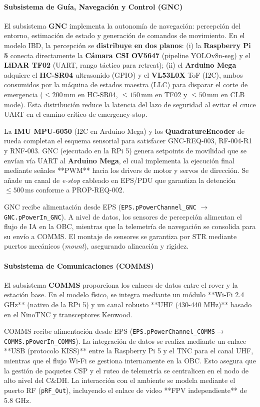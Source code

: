 \paragraph{Subsistema de Guía, Navegación y Control (GNC)}
El subsistema \textbf{GNC} implementa la autonomía de navegación: percepción del entorno, estimación de estado y generación de comandos de movimiento. En el modelo IBD, la percepción se \textbf{distribuye en dos planos}: (i) la \textbf{Raspberry Pi 5} conecta directamente la \textbf{Cámara CSI OV5647} (pipeline YOLOv8n-seg) y el \textbf{LiDAR TF02} (UART, rango táctico para retreat); (ii) el \textbf{Arduino Mega} adquiere el \textbf{HC-SR04} ultrasonido (GPIO) y el \textbf{VL53L0X} ToF (I2C), ambos consumidos por la máquina de estados maestra (LLC) para disparar el corte de emergencia ($\le 200$\,mm en HC-SR04, $\le 150$\,mm en TF02 y $\le 50$\,mm en CLB mode). Esta distribución reduce la latencia del lazo de seguridad al evitar el cruce UART en el camino crítico de emergency-stop.

La \textbf{IMU MPU-6050} (I2C en Arduino Mega) y los \textbf{QuadratureEncoder} de rueda completan el esquema sensorial para satisfacer GNC-REQ-003, RF-004-R1 y RNF-003. GNC (ejecutado en la RPi 5) genera setpoints de movilidad que se envían vía UART al \textbf{Arduino Mega}, el cual implementa la ejecución final mediante señales **PWM** hacia los drivers de motor y servos de dirección. Se añade un canal de \emph{e-stop} cableado en EPS/PDU que garantiza la detención $\le 500$\,ms conforme a PROP-REQ-002.

GNC recibe alimentación desde EPS (\texttt{EPS.pPowerChannel\_GNC} $\rightarrow$ \texttt{GNC.pPowerIn\_GNC}). A nivel de datos, los sensores de percepción alimentan el flujo de IA en la OBC, mientras que la telemetría de navegación se consolida para su envío a COMMS. El montaje de sensores se garantiza por STR mediante puertos mecánicos (\textit{mount}), asegurando alineación y rigidez.

\paragraph{Subsistema de Comunicaciones (COMMS)}
El subsistema \textbf{COMMS} proporciona los enlaces de datos entre el rover y la estación base. En el modelo físico, se integra mediante un módulo **Wi-Fi 2.4 GHz** (nativo de la RPi 5) y un canal robusto **UHF (430-440 MHz)** basado en el NinoTNC y transceptores Kenwood. 

COMMS recibe alimentación desde EPS (\texttt{EPS.\allowbreak pPowerChannel\_\allowbreak COMMS}\linebreak[0] $\rightarrow$ \texttt{COMMS.\allowbreak pPowerIn\_\allowbreak COMMS}). La integración de datos se realiza mediante un enlace **USB (protocolo KISS)** entre la Raspberry Pi 5 y el TNC para el canal UHF, mientras que el flujo Wi-Fi se gestiona internamente en la OBC. Esto asegura que la gestión de paquetes CSP y el ruteo de telemetría se centralicen en el nodo de alto nivel del C\&DH. La interacción con el ambiente se modela mediante el puerto RF (\texttt{pRF\_Out}), incluyendo el enlace de video **FPV independiente** de 5.8 GHz.

